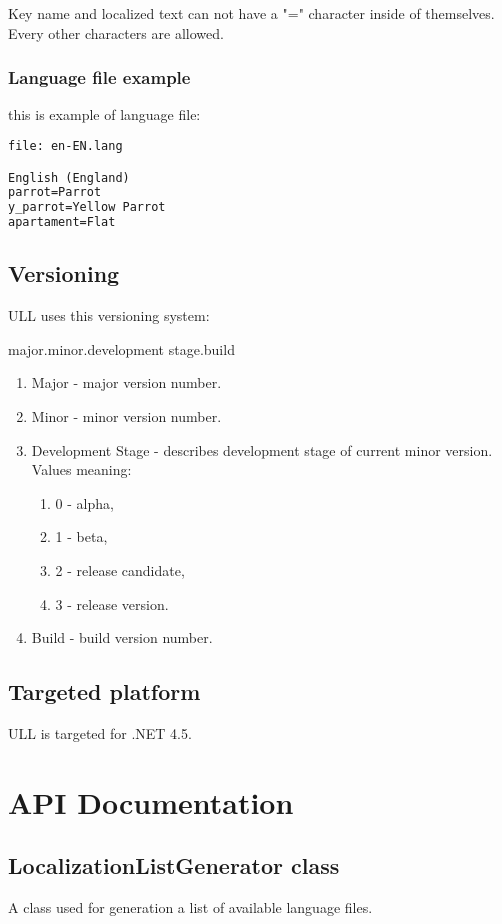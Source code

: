 \documentclass[a4paper]{report}
\begin{document}
Key name and localized text can not have a "=" character inside of themselves. Every other characters are allowed.

\subsection{Language file example}
this is example of language file:
\begin{lstlisting}[language=XML]
file: en-EN.lang

English (England)
parrot=Parrot
y_parrot=Yellow Parrot
apartament=Flat
\end{lstlisting}

\section{Versioning}
ULL uses this versioning system:

major.minor.development stage.build

\begin{enumerate}
\item Major - major version number.
\item Minor - minor version number.
\item Development Stage - describes development stage of current minor version. Values meaning:
\begin{enumerate}
\item 0 - alpha,
\item 1 - beta,
\item 2 - release candidate,
\item 3 - release version.
\end{enumerate}
\item Build - build version number.
\end{enumerate}

\section{Targeted platform}
ULL is targeted for .NET 4.5.

\chapter{API Documentation}
\section{LocalizationListGenerator class}
A class used for generation a list of available language files.
\end{document}
